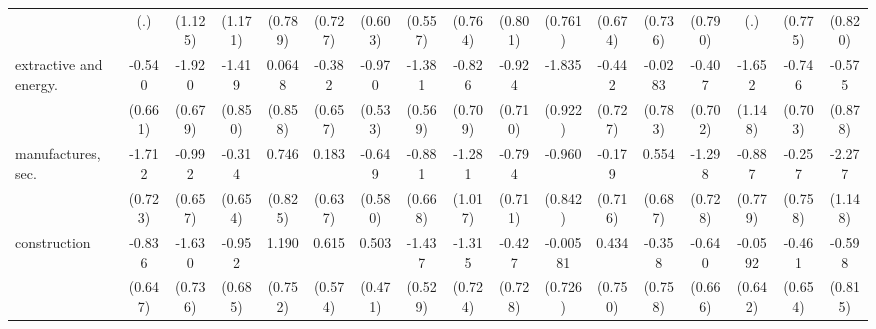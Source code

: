 {\begin{tabular}{l*{16}{c}}
                    &         (.)         &     (1.125)         &     (1.171)         &     (0.789)         &     (0.727)         &     (0.603)         &     (0.557)         &     (0.764)         &     (0.801)         &     (0.761)         &     (0.674)         &     (0.736)         &     (0.790)         &         (.)         &     (0.775)         &     (0.820)         \\
[1em]
extractive and energy.&      -0.540         &      -1.920\sym{**} &      -1.419         &      0.0648         &      -0.382         &      -0.970         &      -1.381\sym{*}  &      -0.826         &      -0.924         &      -1.835\sym{*}  &      -0.442         &     -0.0283         &      -0.407         &      -1.652         &      -0.746         &      -0.575         \\
                    &     (0.661)         &     (0.679)         &     (0.850)         &     (0.858)         &     (0.657)         &     (0.533)         &     (0.569)         &     (0.709)         &     (0.710)         &     (0.922)         &     (0.727)         &     (0.783)         &     (0.702)         &     (1.148)         &     (0.703)         &     (0.878)         \\
[1em]
manufactures, sec.  &      -1.712\sym{*}  &      -0.992         &      -0.314         &       0.746         &       0.183         &      -0.649         &      -0.881         &      -1.281         &      -0.794         &      -0.960         &      -0.179         &       0.554         &      -1.298         &      -0.887         &      -0.257         &      -2.277\sym{*}  \\
                    &     (0.723)         &     (0.657)         &     (0.654)         &     (0.825)         &     (0.637)         &     (0.580)         &     (0.668)         &     (1.017)         &     (0.711)         &     (0.842)         &     (0.716)         &     (0.687)         &     (0.728)         &     (0.779)         &     (0.758)         &     (1.148)         \\
[1em]
construction        &      -0.836         &      -1.630\sym{*}  &      -0.952         &       1.190         &       0.615         &       0.503         &      -1.437\sym{**} &      -1.315         &      -0.427         &    -0.00581         &       0.434         &      -0.358         &      -0.640         &     -0.0592         &      -0.461         &      -0.598         \\
                    &     (0.647)         &     (0.736)         &     (0.685)         &     (0.752)         &     (0.574)         &     (0.471)         &     (0.529)         &     (0.724)         &     (0.728)         &     (0.726)         &     (0.750)         &     (0.758)         &     (0.666)         &     (0.642)         &     (0.654)         &     (0.815)         \\

\end{tabular}}

